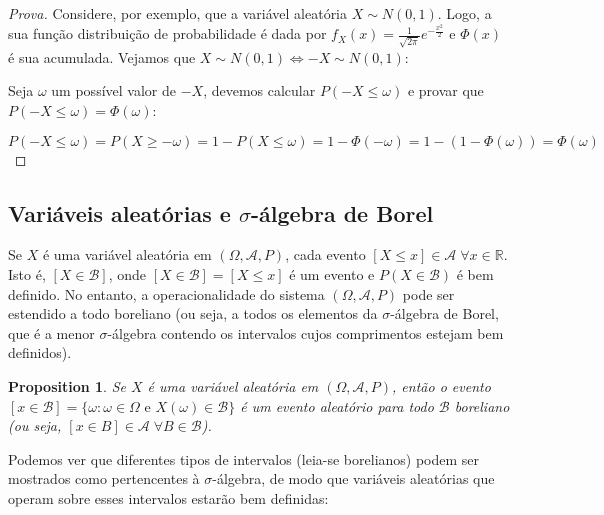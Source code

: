\documentclass[
]{article}
\newtheorem{proposition}{Proposition}[section]
\theoremstyle{definition}
\theoremstyle{definition}
\theoremstyle{definition}
\theoremstyle{definition}
\theoremstyle{remark}
\begin{document}
\begin{proof}[Prova]
Considere, por exemplo, que a variável aleatória \(X \sim N(0,1)\). Logo, a sua função distribuição de probabilidade é dada por \(f_{X}(x) = \frac{1}{\sqrt{2\pi}}e^{-\frac{x^{2}}{2}}\) e \(\Phi(x)\) é sua acumulada. Vejamos que \(X \sim N(0,1) \Longleftrightarrow -X \sim N(0,1)\):

Seja \(\omega\) um possível valor de \(-X\), devemos calcular \(P(-X \le \omega)\) e provar que \(P(-X \le \omega) = \Phi(\omega)\):

\begin{equation*}
P(-X \le \omega) = P(X \ge -\omega) = 1 - P(X \le \omega) = 1 - \Phi(-\omega) = 1 - (1 - \Phi(\omega)) = \Phi(\omega)
\end{equation*}
\end{proof}

\hypertarget{variuxe1veis-aleatuxf3rias-e-sigma-uxe1lgebra-de-borel}{%
\subsection{\texorpdfstring{Variáveis aleatórias e \(\sigma\)-álgebra de Borel}{Variáveis aleatórias e \textbackslash sigma-álgebra de Borel}}\label{variuxe1veis-aleatuxf3rias-e-sigma-uxe1lgebra-de-borel}}

Se \(X\) é uma variável aleatória em \((\Omega, \mathcal{A}, P)\), cada evento \([X \le x] \in \mathcal{A} \; \forall x \in \mathbb{R}\). Isto é, \([X \in \mathcal{B}]\), onde \([X \in \mathcal{B}] = [X \le x]\) é um evento e \(P(X \in \mathcal{B})\) é bem definido. No entanto, a operacionalidade do sistema \((\Omega, \mathcal{A},P)\) pode ser estendido a todo boreliano (ou seja, a todos os elementos da \(\sigma\)-álgebra de Borel, que é a menor \(\sigma\)-álgebra contendo os intervalos cujos comprimentos estejam bem definidos).

\begin{proposition}
Se \(X\) é uma variável aleatória em \((\Omega,\mathcal{A},P)\), então o evento \([x \in \mathcal{B}] = \{\omega : \omega \in \Omega \text{ e } X(\omega) \in \mathcal{B}\}\) é um evento aleatório para todo \(\mathcal{B}\) boreliano (ou seja, \([x \in B] \in \mathcal{A} \; \forall B \in \mathcal{B}\)).
\end{proposition}

Podemos ver que diferentes tipos de intervalos (leia-se borelianos) podem ser mostrados como pertencentes à \(\sigma\)-álgebra, de modo que variáveis aleatórias que operam sobre esses intervalos estarão bem definidas:
\end{document}
